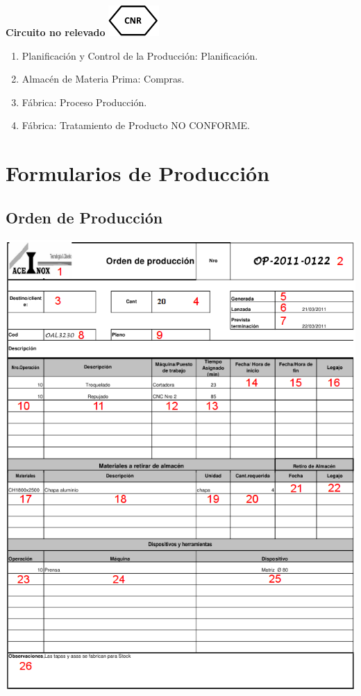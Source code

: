 \begin{center}
  \textbf{Circuito no relevado}
  \includegraphics{./Images/Simbolos/simbolo-CNR.png}
\end{center}
\begin{enumerate}
  \item Planificaci\'on y Control de la Producci\'on: Planificaci\'on.
  \item Almac\'en de Materia Prima: Compras.
  \item F\'abrica: Proceso Producci\'on.\
  \item F\'abrica: Tratamiento de Producto NO CONFORME.
\end{enumerate}

\pagebreak
\section{Formularios de Producci\'on}

\subsection{Orden de Producci\'on}
\begin{center}
 \includegraphics[scale=0.9,keepaspectratio=true]{./Circuitos-Teoricos/Produccion/Images/orden-de-produccion.png}
\end{center}

